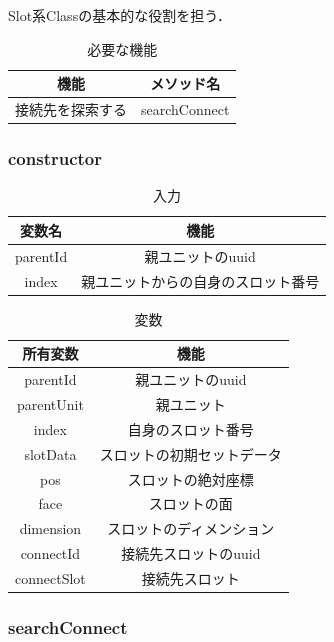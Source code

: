 \documentclass[uplatex,dvipdfmx,report]{jlreq}
\begin{document}
Slot系Classの基本的な役割を担う．

\begin{table}[H]
    \centering
    \caption{必要な機能}
    \begin{tabular}{cc}
        \hline
        機能 & メソッド名 \\
        \hline
        \hline
        接続先を探索する & searchConnect \\
        \hline
    \end{tabular}
\end{table}

\subsubsection{constructor}

\begin{table}[H]
    \centering
    \caption{入力}
    \begin{tabular}{cc}
        \hline
        変数名 & 機能 \\
        \hline
        \hline
        parentId & 親ユニットのuuid \\
        index & 親ユニットからの自身のスロット番号 \\
        \hline
    \end{tabular}
\end{table}

\begin{table}[H]
    \centering
    \caption{変数}
    \begin{tabular}{cc}
        \hline
        所有変数 & 機能 \\
        \hline
        \hline
        parentId & 親ユニットのuuid \\
        parentUnit & 親ユニット \\
        index & 自身のスロット番号 \\
        slotData & スロットの初期セットデータ \\
        pos & スロットの絶対座標 \\
        face & スロットの面 \\
        dimension & スロットのディメンション \\
        connectId & 接続先スロットのuuid \\
        connectSlot & 接続先スロット \\
        \hline
    \end{tabular}
\end{table}

\subsubsection{searchConnect}
\end{document}
